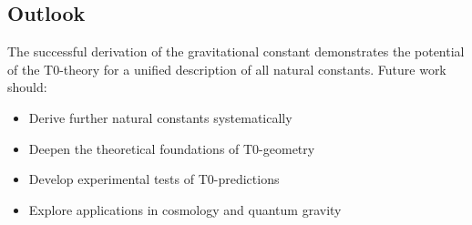 \documentclass[12pt,a4paper]{article}
\begin{document}
	\subsection{Outlook}
	
	The successful derivation of the gravitational constant demonstrates the potential of the T0-theory for a unified description of all natural constants. Future work should:
	
	\begin{itemize}
		\item Derive further natural constants systematically
		\item Deepen the theoretical foundations of T0-geometry
		\item Develop experimental tests of T0-predictions
		\item Explore applications in cosmology and quantum gravity
	\end{itemize}
	
\end{document}
